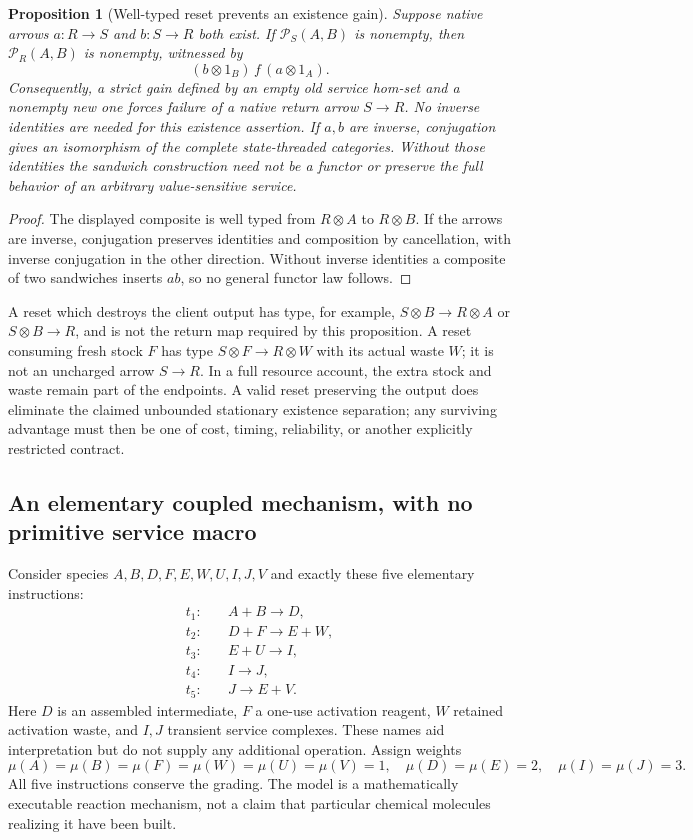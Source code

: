 \documentclass[11pt]{article}
\newtheorem{proposition}[theorem]{Proposition}
\theoremstyle{definition}
\theoremstyle{remark}
\begin{document}
\begin{proposition}[Well-typed reset prevents an existence gain]\label{er:prop:reset}
Suppose native arrows $a:R\to S$ and $b:S\to R$ both exist. If $\mathcal P_S(A,B)$ is nonempty, then $\mathcal P_R(A,B)$ is nonempty, witnessed by
\[
 (b\otimes1_B)\,f\,(a\otimes1_A).
\]
Consequently, a strict gain defined by an empty old service hom-set and a nonempty new one forces failure of a native return arrow $S\to R$. No inverse identities are needed for this existence assertion. If $a,b$ are inverse, conjugation gives an isomorphism of the complete state-threaded categories. Without those identities the sandwich construction need not be a functor or preserve the full behavior of an arbitrary value-sensitive service.
\end{proposition}
\begin{proof}
The displayed composite is well typed from $R\otimes A$ to $R\otimes B$. If the arrows are inverse, conjugation preserves identities and composition by cancellation, with inverse conjugation in the other direction. Without inverse identities a composite of two sandwiches inserts $ab$, so no general functor law follows.
\end{proof}

A reset which destroys the client output has type, for example, $S\otimes B\to R\otimes A$ or $S\otimes B\to R$, and is not the return map required by this proposition. A reset consuming fresh stock $F$ has type $S\otimes F\to R\otimes W$ with its actual waste $W$; it is not an uncharged arrow $S\to R$. In a full resource account, the extra stock and waste remain part of the endpoints. A valid reset preserving the output does eliminate the claimed unbounded stationary existence separation; any surviving advantage must then be one of cost, timing, reliability, or another explicitly restricted contract.

\subsection{An elementary coupled mechanism, with no primitive service macro}
Consider species $A,B,D,F,E,W,U,I,J,V$ and exactly these five elementary instructions:
\begin{align*}
 t_1:&\quad A+B\longrightarrow D,\\
 t_2:&\quad D+F\longrightarrow E+W,\\
 t_3:&\quad E+U\longrightarrow I,\\
 t_4:&\quad I\longrightarrow J,\\
 t_5:&\quad J\longrightarrow E+V.
\end{align*}
Here $D$ is an assembled intermediate, $F$ a one-use activation reagent, $W$ retained activation waste, and $I,J$ transient service complexes. These names aid interpretation but do not supply any additional operation. Assign weights
\[
 \mu(A)=\mu(B)=\mu(F)=\mu(W)=\mu(U)=\mu(V)=1,
 \quad\mu(D)=\mu(E)=2,
 \quad\mu(I)=\mu(J)=3.
\]
All five instructions conserve the grading. The model is a mathematically executable reaction mechanism, not a claim that particular chemical molecules realizing it have been built.
\end{document}
